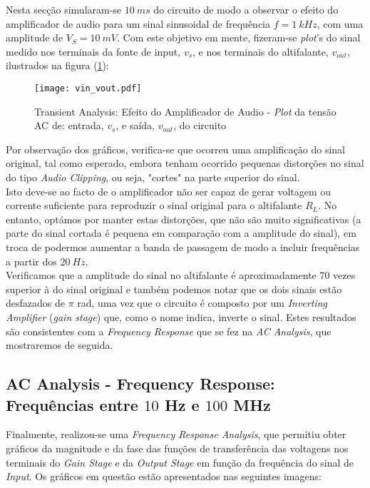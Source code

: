 Nesta secção simularam-se $10 \: ms$ do circuito de modo a observar o efeito do amplificador de audio para um
sinal sinusoidal de frequência $f = 1 \: kHz$, com uma amplitude de $V_S = 10 \: mV$. Com este objetivo em
mente, fizeram-se \emph{plot}'s do sinal medido nos terminais da fonte de input, $v_{s}$, e nos terminais
do altifalante, $v_{out}$, ilustrados na figura (\ref{fig:TASimSignal}):

\begin{figure}[H] \centering
  \texttt{[image: vin\_vout.pdf]}
  \caption{Transient Analysis: Efeito do Amplificador de Audio - \emph{Plot} da tensão AC de: entrada, $v_s$, e saída, $v_{out}$, do circuito}
  \label{fig:TASimSignal}
\end{figure}

Por observação dos gráficos, verifica-se que ocorreu uma amplificação do sinal original, tal como esperado,
embora tenham ocorrido pequenas distorções no sinal do tipo \emph{Audio Clipping}, ou seja, "cortes" na parte superior do sinal.
\\
Isto deve-se ao facto de o amplificador não ser capaz de gerar voltagem ou corrente suficiente para reproduzir
o sinal original para o altifalante $R_L$. No entanto, optámos por manter
estas distorções, que não são muito significativas (a parte do sinal cortada é pequena em comparação com a
amplitude do sinal), em troca de podermos aumentar a banda de passagem de modo a incluir frequências a partir dos
$20 \: Hz$.
\\
Verificamos que a amplitude do sinal no altifalante é aproximadamente $70$ vezes superior à do sinal original e também podemos 
notar que os dois sinais estão desfazados de $\pi$ rad, uma vez que o circuito é composto por um
\emph{Inverting Amplifier} (\emph{gain stage}) que, como o nome indica, inverte o sinal. Estes resultados são consistentes com
a \emph{Frequency Response} que se fez na \emph{AC Analysis}, que mostraremos de seguida.


\subsection{AC Analysis - Frequency Response: Frequências entre $10$ Hz e $100$ MHz}

Finalmente, realizou-se uma \emph{Frequency Response Analysis}, que permitiu obter gráficos da magnitude e da fase das funções de transferência
das voltagens nos terminais do \emph{Gain Stage} e da \emph{Output Stage} em função da frequência do sinal de
\emph{Input}. Os gráficos em questão estão apresentados nas seguintes imagens:

